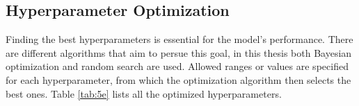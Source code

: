 


\subsection{Hyperparameter Optimization}
\label{sec:funcgat}

Finding the best hyperparameters is essential for the model's performance. There are different algorithms that aim to persue this goal, in this thesis
both Bayesian optimization and random search are used. Allowed ranges or values are specified for each hyperparameter, from which the optimization algorithm then selects the best ones.
Table \ref{tab:5e} lists all the optimized hyperparameters.

